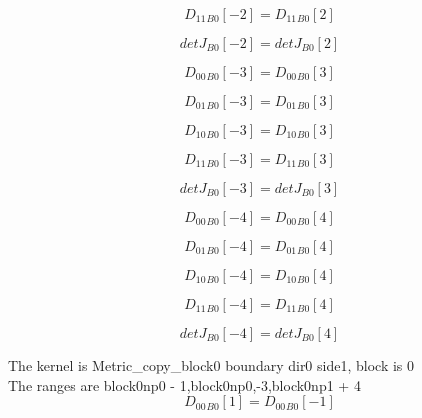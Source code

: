 \documentclass{article}
\begin{document}
\begin{dmath}{D_{11}{_{B0}}}[{-2}] = {D_{11}{_{B0}}}[{2}]\end{dmath}

\begin{dmath}{detJ{_{B0}}}[{-2}] = {detJ{_{B0}}}[{2}]\end{dmath}

\begin{dmath}{D_{00}{_{B0}}}[{-3}] = {D_{00}{_{B0}}}[{3}]\end{dmath}

\begin{dmath}{D_{01}{_{B0}}}[{-3}] = {D_{01}{_{B0}}}[{3}]\end{dmath}

\begin{dmath}{D_{10}{_{B0}}}[{-3}] = {D_{10}{_{B0}}}[{3}]\end{dmath}

\begin{dmath}{D_{11}{_{B0}}}[{-3}] = {D_{11}{_{B0}}}[{3}]\end{dmath}

\begin{dmath}{detJ{_{B0}}}[{-3}] = {detJ{_{B0}}}[{3}]\end{dmath}

\begin{dmath}{D_{00}{_{B0}}}[{-4}] = {D_{00}{_{B0}}}[{4}]\end{dmath}

\begin{dmath}{D_{01}{_{B0}}}[{-4}] = {D_{01}{_{B0}}}[{4}]\end{dmath}

\begin{dmath}{D_{10}{_{B0}}}[{-4}] = {D_{10}{_{B0}}}[{4}]\end{dmath}

\begin{dmath}{D_{11}{_{B0}}}[{-4}] = {D_{11}{_{B0}}}[{4}]\end{dmath}

\begin{dmath}{detJ{_{B0}}}[{-4}] = {detJ{_{B0}}}[{4}]\end{dmath}

\noindent The kernel is Metric_copy_block0 boundary dir0 side1, block is 0\\\noindent The ranges are block0np0 - 1,block0np0,-3,block0np1 + 4\\\begin{dmath}{D_{00}{_{B0}}}[{1}] = {D_{00}{_{B0}}}[{-1}]\end{dmath}
\end{document}
